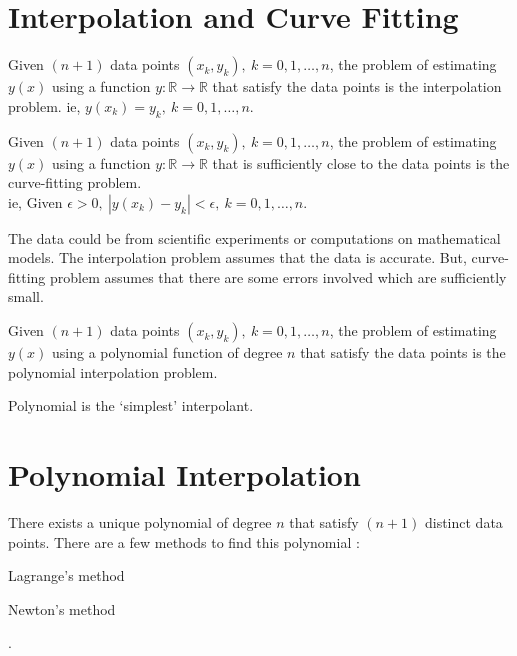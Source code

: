 \section{Interpolation and Curve Fitting}
\begin{definition}
	Given $(n+1)$ data points $(x_k, y_k),\ k = 0,1,\dots,n$, the problem of estimating $y(x)$ using a function $y : \mathbb{R} \to \mathbb{R}$ that satisfy the data points is the interpolation problem.
	ie, $y(x_k) = y_k,\ k = 0,1,\dots,n$.
\end{definition}
\begin{definition}
	Given $(n+1)$ data points $(x_k,y_k),\ k = 0,1,\dots,n$, the problem of estimating $y(x)$ using a function $y : \mathbb{R} \to \mathbb{R}$ that is sufficiently close to the data points is the curve-fitting problem.\\
	ie, Given $\epsilon > 0,\ |y(x_k)-y_k| < \epsilon,\ k = 0,1,\dots,n$.
\end{definition}
\begin{remark}
\begin{commentary}
The data could be from scientific experiments or computations on mathematical models.
	The interpolation problem assumes that the data is accurate.
	But, curve-fitting problem assumes that there are some errors involved which are sufficiently small.
\end{commentary}
\end{remark}
\begin{definition}
	Given $(n+1)$ data points $(x_k,y_k),\ k = 0,1,\dots,n$, the problem of estimating $y(x)$ using a polynomial function of degree $n$ that satisfy the data points is the polynomial interpolation problem.
\end{definition}
\begin{remark}
	Polynomial is the `simplest' interpolant.
	\cite[3.2]{kiusalaas}
\end{remark}

\section{Polynomial Interpolation}
There exists a unique polynomial of degree $n$ that satisfy $(n+1)$ distinct data points.
There are a few methods to find this polynomial : 
\begin{enumerate*}
	\item Lagrange's method
	\item Newton's method
\end{enumerate*}.

